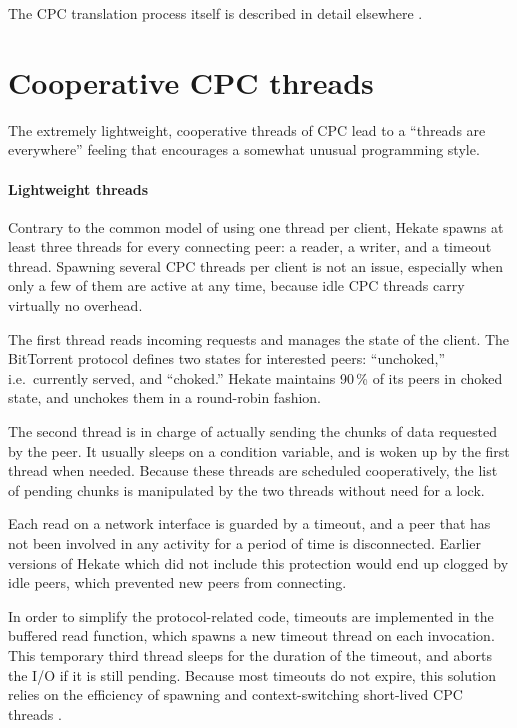 \documentclass{easychair}
\begin{document}
The CPC translation process itself is described in detail elsewhere
\cite{cpc2010}.

\section{Cooperative CPC threads}
\label{sec:cpc-threads}

The extremely lightweight, cooperative threads of CPC lead to a ``threads
are everywhere'' feeling that encourages a somewhat unusual programming
style.

\paragraph{Lightweight threads}
Contrary to the common model of using one thread per client, Hekate
spawns at least three threads for every connecting peer: a reader, a
writer, and a timeout thread.  Spawning several CPC threads per client
is not an issue, especially when only a few of them are active at any
time, because idle CPC threads carry virtually no overhead.

The first thread reads incoming requests and manages the state of the
client.  The BitTorrent protocol defines two states for interested peers:
``unchoked,'' i.e.\ currently served, and ``choked.''  Hekate maintains
90\,\% of its peers in choked state, and unchokes them in a round-robin
fashion.

The second thread is in charge of actually sending the chunks of data
requested by the peer.  It usually sleeps on a condition variable,
and is woken up by the first thread when needed.  Because these
threads are scheduled cooperatively, the list of pending chunks is
manipulated by the two threads without need for a lock.

Each read on a network interface is guarded by a timeout, and a peer that
has not been involved in any activity for a period of time is disconnected.
Earlier versions of Hekate which did not include this protection would end
up clogged by idle peers, which prevented new peers from connecting.

In order to simplify the protocol-related code, timeouts are implemented in
the buffered read function, which spawns a new timeout thread on each
invocation.  This temporary third thread sleeps for the duration of the timeout,
and aborts the I/O if it is still pending.  Because most timeouts do not
expire, this solution relies on the efficiency of spawning and
context-switching short-lived CPC threads \cite{chroboczek,cpc2010}.
\end{document}
